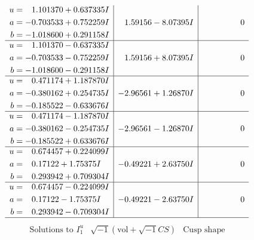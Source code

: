 \documentclass[1p]{elsarticle_modified}
\theoremstyle{definition}
\newcommand{\I}{\sqrt{-1}}
\begin{document}
$$\begin{array}{c|c|c}
\begin{aligned}
u &= \phantom{-}1.101370 + 0.637335 I \\
a &= -0.703533 + 0.752259 I \\
b &= -1.018600 + 0.291158 I\end{aligned}
 & \phantom{-}1.59156 - 8.07395 I & \phantom{-0.000000 } 0 \\ \hline\begin{aligned}
u &= \phantom{-}1.101370 - 0.637335 I \\
a &= -0.703533 - 0.752259 I \\
b &= -1.018600 - 0.291158 I\end{aligned}
 & \phantom{-}1.59156 + 8.07395 I & \phantom{-0.000000 } 0 \\ \hline\begin{aligned}
u &= \phantom{-}0.471174 + 1.187870 I \\
a &= -0.380162 + 0.254735 I \\
b &= -0.185522 - 0.633676 I\end{aligned}
 & -2.96561 + 1.26870 I & \phantom{-0.000000 } 0 \\ \hline\begin{aligned}
u &= \phantom{-}0.471174 - 1.187870 I \\
a &= -0.380162 - 0.254735 I \\
b &= -0.185522 + 0.633676 I\end{aligned}
 & -2.96561 - 1.26870 I & \phantom{-0.000000 } 0 \\ \hline\begin{aligned}
u &= \phantom{-}0.674457 + 0.224099 I \\
a &= \phantom{-}0.17122 + 1.75375 I \\
b &= \phantom{-}0.293942 + 0.709304 I\end{aligned}
 & -0.49221 + 2.63750 I & \phantom{-0.000000 } 0 \\ \hline\begin{aligned}
u &= \phantom{-}0.674457 - 0.224099 I \\
a &= \phantom{-}0.17122 - 1.75375 I \\
b &= \phantom{-}0.293942 - 0.709304 I\end{aligned}
 & -0.49221 - 2.63750 I & \phantom{-0.000000 } 0\\
 \hline 
 \end{array}$$\newpage$$\begin{array}{c|c|c}  
\text{Solutions to }I^u_{1}& \I (\text{vol} + \sqrt{-1}CS) & \text{Cusp shape}\\
 \hline 
\begin{aligned}

\end{aligned}
\end{array}$$
\end{document}
